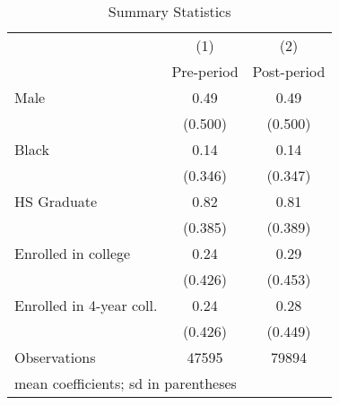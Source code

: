 \begin{table}[htbp]\tiny
\centering
\caption{Summary Statistics}
\begin{tabular}{l*{2}{c}}
\hline\hline
                    &\multicolumn{1}{c}{(1)}&\multicolumn{1}{c}{(2)}\\
                    &\multicolumn{1}{c}{Pre-period}&\multicolumn{1}{c}{Post-period}\\
\hline
Male                &        0.49&        0.49\\
                    &     (0.500)&     (0.500)\\
[1em]
Black               &        0.14&        0.14\\
                    &     (0.346)&     (0.347)\\
[1em]
HS Graduate         &        0.82&        0.81\\
                    &     (0.385)&     (0.389)\\
[1em]
Enrolled in college &        0.24&        0.29\\
                    &     (0.426)&     (0.453)\\
[1em]
Enrolled in 4-year coll.&        0.24&        0.28\\
                    &     (0.426)&     (0.449)\\
\hline
Observations        &       47595&       79894\\
\hline\hline
\multicolumn{3}{l}{\footnotesize mean coefficients; sd in parentheses}\\
\end{tabular}
\end{table}
